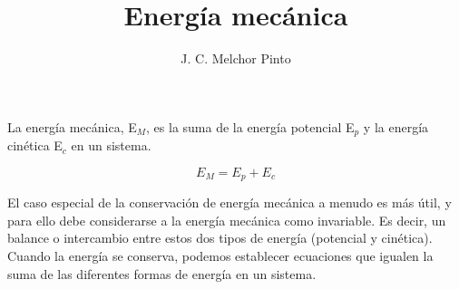 \documentclass[12pt]{guia}
\title{Energía mecánica}
\author{J. C. Melchor Pinto}
\begin{document}
\pagestyle{headandfoot}
\addpoints
\INFO
\begin{opening}
    {La energía mecánica, E$_M$, es la suma de la energía potencial E$_p$ y
        la energía cinética E$_c$ en un sistema.

        \[ E_M=E_p+E_c\]

        El caso especial de la conservación de energía mecánica a menudo es más útil, y para ello debe considerarse a la energía mec\'anica como invariable. Es decir, un balance o intercambio entre estos dos tipos de energía (potencial y cinética). Cuando la energía se conserva, podemos establecer ecuaciones que igualen la suma de las diferentes formas de energía en un sistema.
    }
\end{opening}
\begin{questions}
    
    \newpage
    
    \newpage
    
\end{questions}

\end{document}
